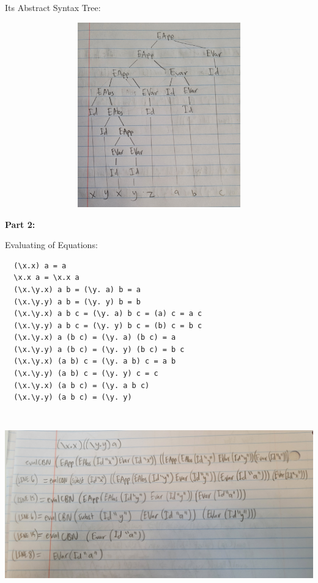 \documentclass{article}
\theoremstyle{theorem}
\theoremstyle{definition}
\theoremstyle{remark}
\begin{document}
Its Abstract Syntax Tree:

\includegraphics[width=15cm, height=8cm]{Report Images/week5_8.jpg}

\textbf{Part 2:}

Evaluating of Equations:
\begin{lstlisting}
  (\x.x) a = a
  \x.x a = \x.x a
  (\x.\y.x) a b = (\y. a) b = a
  (\x.\y.y) a b = (\y. y) b = b
  (\x.\y.x) a b c = (\y. a) b c = (a) c = a c
  (\x.\y.y) a b c = (\y. y) b c = (b) c = b c
  (\x.\y.x) a (b c) = (\y. a) (b c) = a
  (\x.\y.y) a (b c) = (\y. y) (b c) = b c
  (\x.\y.x) (a b) c = (\y. a b) c = a b
  (\x.\y.y) (a b) c = (\y. y) c = c
  (\x.\y.x) (a b c) = (\y. a b c)
  (\x.\y.y) (a b c) = (\y. y)
\end{lstlisting}

\includegraphics[width=15cm, height=8cm]{Report Images/week5_9.jpg}
\end{document}
